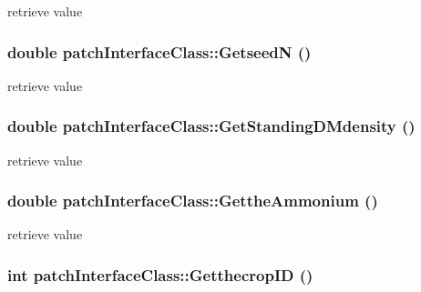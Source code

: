 retrieve value \hypertarget{classpatch_interface_class_a94ec9c977c97d369b6538a7f7fd2efa5}{
\subsubsection[{GetseedN}]{\setlength{\rightskip}{0pt plus 5cm}double patchInterfaceClass::GetseedN ()}}
\label{classpatch_interface_class_a94ec9c977c97d369b6538a7f7fd2efa5}


retrieve value \hypertarget{classpatch_interface_class_a9af6335434ca1be9ad6ea50bb4a91530}{
\subsubsection[{GetStandingDMdensity}]{\setlength{\rightskip}{0pt plus 5cm}double patchInterfaceClass::GetStandingDMdensity ()}}
\label{classpatch_interface_class_a9af6335434ca1be9ad6ea50bb4a91530}


retrieve value \hypertarget{classpatch_interface_class_a322c770b108657a636cc2e06b73963e9}{
\subsubsection[{GettheAmmonium}]{\setlength{\rightskip}{0pt plus 5cm}double patchInterfaceClass::GettheAmmonium ()}}
\label{classpatch_interface_class_a322c770b108657a636cc2e06b73963e9}


retrieve value \hypertarget{classpatch_interface_class_a84224ea36bd61be5e8c25c4fcdc2d350}{
\subsubsection[{GetthecropID}]{\setlength{\rightskip}{0pt plus 5cm}int patchInterfaceClass::GetthecropID ()}}
\label{classpatch_interface_class_a84224ea36bd61be5e8c25c4fcdc2d350}


